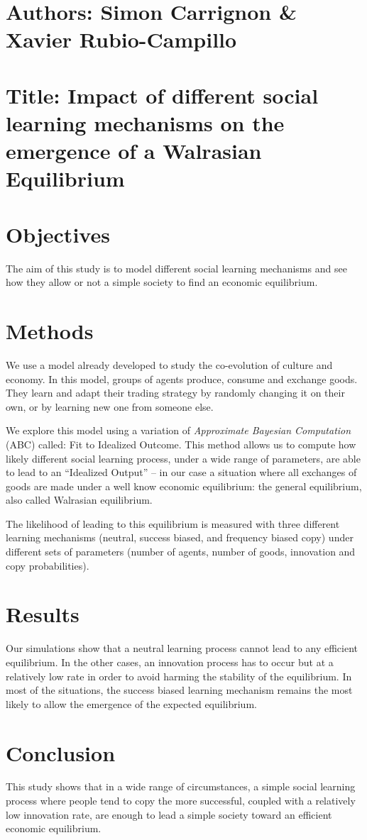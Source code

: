 \documentclass[a4paper,10pt]{paper}
\begin{document}
\section*{Authors: Simon Carrignon \& Xavier Rubio-Campillo}

\section*{Title: Impact of different social learning mechanisms on the emergence of a Walrasian Equilibrium}

\section{Objectives}
The aim of this study is to model different social learning mechanisms and see how they allow or not a simple society to find an economic equilibrium.

\section{Methods}
We use a model already developed to study the co-evolution of culture and economy. In this model, groups of agents produce, consume and exchange goods. They learn and adapt their trading strategy by randomly changing it on their own, or by learning new one from someone else. 

We explore this model using a variation of \emph{Approximate Bayesian Computation} (ABC) called: Fit to Idealized Outcome. This method allows us to compute how likely different social learning process, under a wide range of parameters, are able to lead to an ``Idealized Output'' -- in our case a situation where all exchanges of goods are made under a well know economic equilibrium: the  general equilibrium, also called Walrasian equilibrium.

The likelihood of leading to this equilibrium is measured with three different learning mechanisms (neutral, success biased, and frequency biased copy) under different sets of parameters (number of agents, number of goods, innovation and copy probabilities).

\section{Results}

Our simulations show that a neutral learning process cannot lead to any efficient equilibrium. In the other cases, an innovation process has to occur but at a relatively low rate in order to avoid harming the stability of the equilibrium. In most of the situations, the success biased learning mechanism remains the most likely to allow the emergence of the expected equilibrium.


\section{Conclusion}

This study shows that in a wide range of circumstances, a simple social learning process where people tend to copy the more successful, coupled with a relatively low innovation rate, are enough to lead a simple society toward an efficient economic equilibrium.
\end{document}
